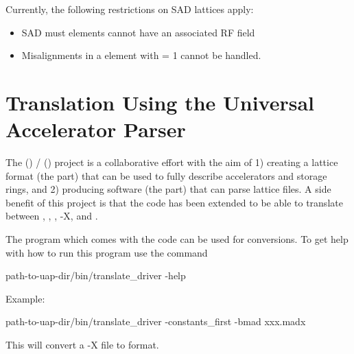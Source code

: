 Currently, the following restrictions on SAD lattices apply:
  \begin{itemize}
  \item
SAD must elements cannot have an associated RF field
  \item
Misalignments in a  element with  = 1 cannot be handled.
  \end{itemize}

\section{Translation Using the Universal Accelerator Parser}
\label{s:aml}

The  () /  () project\cite{b:aml} is a collaborative
effort with the aim of 1) creating a lattice format (the 
part) that can be used to fully describe accelerators and storage
rings, and 2) producing software (the  part) that can parse
 lattice files. A side benefit of this project is that the
 code has been extended to be able to translate between
, \bmad, , \mad-X, and . 

The program
 which comes with the  code can be used
for conversions. To get help with how to run this program use the command
\begin{example}
  path-to-uap-dir/bin/translate_driver -help
\end{example}
Example:
\begin{example}
  path-to-uap-dir/bin/translate_driver -constants_first -bmad xxx.madx
\end{example}
This will convert a \mad-X file  to \bmad format.
